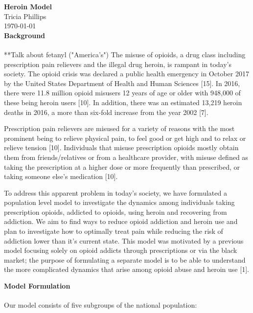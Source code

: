\documentclass[12pt]{article}
\begin{document}
\textbf{Heroin Model} \\
Tricia Phillips \\
\today \\

\textbf{Background} \\ \\**Talk about fetanyl ("America's")
The misuse of opioids, a drug class including prescription pain relievers and the illegal drug heroin, is rampant in today's society. The opioid crisis was declared a public health emergency in October 2017 by the United States Department of Health and Human Sciences [15]. In 2016, there were 11.8 million opioid misusers 12 years of age or older with 948,000 of these being heroin users [10]. In addition, there was an estimated 13,219 heroin deaths in 2016, a more than six-fold increase from the year 2002 [7]. 

Prescription pain relievers are misused for a variety of reasons with the most prominent being to relieve physical pain, to feel good or get high and to relax or relieve tension [10]. Individuals that misuse prescription opioids mostly obtain them from friends/relatives or from a healthcare provider, with misuse defined as taking the prescription at a higher dose or more frequently than prescribed, or taking someone else's medication [10]. 

To address this apparent problem in today's society, we have formulated a population level model to investigate the dynamics among individuals taking prescription opioids, addicted to opioids, using heroin and recovering from addiction. We aim to find ways to reduce opioid addiction and heroin use and plan to investigate how to optimally treat pain while reducing the risk of addiction lower than it's current state. This model was motivated by a previous model focusing solely on opioid addicts through prescriptions or via the black market; the purpose of formulating a separate model is to be able to understand the more complicated dynamics that arise among opioid abuse and heroin use [1].  

\textbf{Model Formulation} \\ \\
Our model consists of five subgroups of the national population: 
\end{document}
